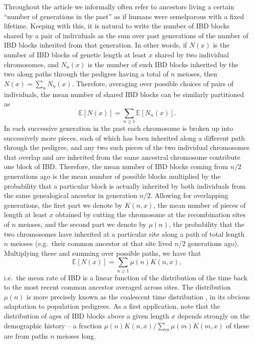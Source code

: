 \documentclass{article}
\newcommand{\E}{\mathbb{E}}
\begin{document}
Throughout the article we informally often refer to ancestors living a certain ``number of generations in the past''
as if humans were semelparous with a fixed lifetime.
Keeping with this, it is natural to write the number of IBD blocks shared by a pair of individuals
as the sum over past generations of the number of IBD blocks inherited from that generation.
In other words, if $N(x)$ is the number of IBD blocks of genetic length at least $x$ shared by two individual chromosomes,
and $N_n(x)$ is the number of such IBD blocks inherited by the two along paths through the pedigree
having a total of $n$ meioses, then $N(x) = \sum_n N_n(x)$.
Therefore, averaging over possible choices of pairs of individuals,
the mean number of shared IBD blocks can be similarly partitioned as
\begin{equation} 
  \E[ N(x) ] = \sum_{n \ge 1} \E[ N_n(x) ] .
\end{equation}
In each successive generation in the past each chromosome is broken up into successively more pieces,
each of which has been inherited along a different path through the pedigree,
and any two such pieces of the two individual chromosomes
that overlap and are inherited from the same ancestral chromosome
contribute one block of IBD.
Therefore, the mean number of IBD blocks coming from $n/2$ generations ago
is the mean number of possible blocks
multiplied by the probability that a particular block
is actually inherited by both individuals from the same genealogical ancestor in generation $n/2$.
Allowing for overlapping generations,
the first part we denote by $K(n,x)$, 
the mean number of pieces of length at least $x$ obtained by cutting the chromosome at the recombination sites of $n$ meioses,
and the second part we denote by $\mu(n)$, 
the probability that the two chromosomes have inherited at a particular site along a path of total length $n$ meioses
(e.g.\ their common ancestor at that site lived $n/2$ generations ago).
Multiplying these and summing over possible paths, we have that
\begin{equation} \label{eqn:linear_relationship}
  \E[ N(x) ] = \sum_{n \ge 1} \mu(n) K(n,x) ,
\end{equation}
i.e.\ the mean rate of IBD is a linear function of the distribution of the time back to the most recent common ancestor averaged across sites.
The distribution $\mu(n)$ is more precisely known as the coalescent time distribution \citep{kingman1982coalescent,wakeley2005coalescent},
in its obvious adaptation to population pedigrees.
As a first application, note that the distribution of ages
of IBD blocks above a given length $x$ depends strongly on the demographic history -- 
a fraction $\mu(n) K(n,x)/\sum_m \mu(m) K(m,x)$ of these are from paths $n$ meioses long.
\end{document}
